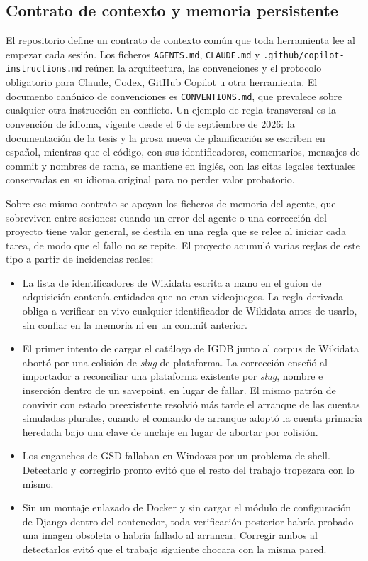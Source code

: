 \subsection{Contrato de contexto y memoria persistente}\label{sec:met-contrato-contexto}

El repositorio define un contrato de contexto común que toda herramienta lee al empezar cada
sesión. Los ficheros \texttt{AGENTS.md}, \texttt{CLAUDE.md} y
\texttt{.github/copilot-instructions.md} reúnen la arquitectura, las convenciones y el
protocolo obligatorio para Claude, Codex, GitHub Copilot u otra herramienta. El documento
canónico de convenciones es \texttt{CONVENTIONS.md}, que prevalece sobre cualquier otra
instrucción en conflicto. Un ejemplo de regla transversal es la convención de idioma, vigente
desde el 6 de septiembre de 2026: la documentación de la tesis y la prosa nueva de
planificación se escriben en español, mientras que el código, con sus identificadores,
comentarios, mensajes de commit y nombres de rama, se mantiene en inglés, con las citas legales
textuales conservadas en su idioma original para no perder valor probatorio.

Sobre ese mismo contrato se apoyan los ficheros de memoria del agente, que sobreviven entre
sesiones: cuando un error del agente o una corrección del proyecto tiene valor general, se
destila en una regla que se relee al iniciar cada tarea, de modo que el fallo no se repite. El
proyecto acumuló varias reglas de este tipo a partir de incidencias reales:

\begin{itemize}
    \item La lista de identificadores de Wikidata escrita a mano en el guion de adquisición
    contenía entidades que no eran videojuegos. La regla derivada obliga a verificar en vivo
    cualquier identificador de Wikidata antes de usarlo, sin confiar en la memoria ni en un
    commit anterior.
    \item El primer intento de cargar el catálogo de IGDB junto al corpus de Wikidata abortó
    por una colisión de \textit{slug} de plataforma. La corrección enseñó al importador a
    reconciliar una plataforma existente por \textit{slug}, nombre e inserción dentro de un
    savepoint, en lugar de fallar. El mismo patrón de convivir con estado preexistente
    resolvió más tarde el arranque de las cuentas simuladas plurales, cuando el comando de
    arranque adoptó la cuenta primaria heredada bajo una clave de anclaje en lugar de abortar
    por colisión.
    \item Los enganches de GSD fallaban en Windows por un problema de shell. Detectarlo y
    corregirlo pronto evitó que el resto del trabajo tropezara con lo mismo.
    \item Sin un montaje enlazado de Docker y sin cargar el módulo de configuración de Django
    dentro del contenedor, toda verificación posterior habría probado una imagen obsoleta o
    habría fallado al arrancar. Corregir ambos al detectarlos evitó que el trabajo siguiente
    chocara con la misma pared.
\end{itemize}

